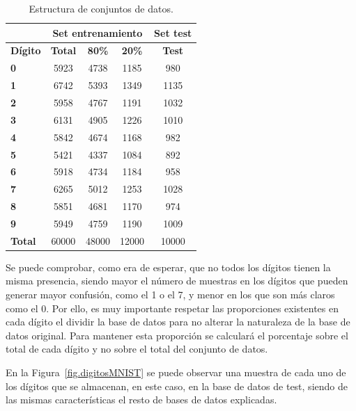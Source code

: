 \begin{table}[H]
	\centering
	\begin{tabular}{l|c|c|c|c|}
		\cline{2-5}
		& \multicolumn{3}{|c|}{\textbf{Set entrenamiento}} & \textbf{Set test} \\
		\hline
		\multicolumn{1}{|l|}{\textbf{Dígito}} & \textbf{Total} & \textbf{80\%} & \textbf{20\%} & \textbf{Test}\\
		\hline 
		\multicolumn{1}{|l|}{\textbf{0}} & 5923 & 4738 & 1185 & 980\\ \hline
		\multicolumn{1}{|l|}{\textbf{1}} & 6742 & 5393 & 1349 & 1135\\ \hline
		\multicolumn{1}{|l|}{\textbf{2}} & 5958 & 4767 & 1191 & 1032\\ \hline
		\multicolumn{1}{|l|}{\textbf{3}} & 6131 & 4905 & 1226 & 1010\\ \hline
		\multicolumn{1}{|l|}{\textbf{4}} & 5842 & 4674 & 1168 & 982\\ \hline
		\multicolumn{1}{|l|}{\textbf{5}} & 5421 & 4337 & 1084 & 892\\ \hline
		\multicolumn{1}{|l|}{\textbf{6}} & 5918 & 4734 & 1184 & 958\\ \hline
		\multicolumn{1}{|l|}{\textbf{7}} & 6265 & 5012 & 1253 & 1028\\ \hline
		\multicolumn{1}{|l|}{\textbf{8}} & 5851 & 4681 & 1170 & 974\\ \hline
		\multicolumn{1}{|l|}{\textbf{9}} & 5949 & 4759 & 1190 & 1009\\ \hline
		\multicolumn{1}{|l|}{\textbf{Total}} & 60000 & 48000 & 12000 & 10000\\ \hline
	\end{tabular}
	\caption{Estructura de conjuntos de datos.}
	\label{tab.baseDatos}
\end{table}

Se puede comprobar, como era de esperar, que no todos los dígitos tienen la misma presencia, siendo mayor el número de muestras en los dígitos que pueden generar mayor confusión, como el 1 o el 7, y menor en los que son más claros como el 0. Por ello, es muy importante respetar las proporciones existentes en cada dígito el dividir la base de datos para no alterar la naturaleza de la base de datos original. Para mantener esta proporción se calculará el porcentaje sobre el total de cada dígito y no sobre el total del conjunto de datos.\\
\vspace{-20pt}

En la Figura~\ref{fig.digitosMNIST} se puede observar una muestra de cada uno de los dígitos que se almacenan, en este caso, en la base de datos de test, siendo de las mismas características el resto de bases de datos explicadas.

